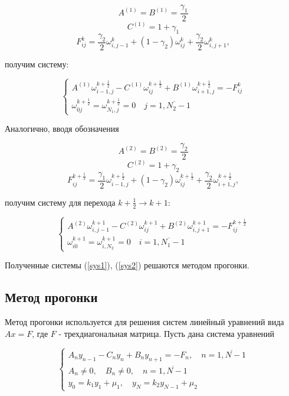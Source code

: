 \documentclass[12pt]{article}
\begin{document}
			$$A^{(1)} = B^{(1)} = \frac{\gamma_1}{2}$$
			$$C^{(1)} = 1 + \gamma_1$$
			$$F^k_{ij} = \frac{\gamma_2}{2} \omega^k_{i,j-1} + (1 - \gamma_2) \omega^k_{ij} + \frac{\gamma_2}{2} \omega^k_{i,j+1},$$
		
			получим систему:
				
				\begin{equation}
					\begin{cases}
						A^{(1)} \omega^{k + \frac{1}{2}}_{i-1,j} - C^{(1)} \omega^{k+\frac{1}{2}}_{ij} + B^{(1)} \omega^{k+\frac{1}{2}}_{i+1,j} = -F^k_{ij} \\
						\omega^{k+\frac{1}{2}}_{0j} = \omega^{k+\frac{1}{2}}_{N_1,j} = 0 \quad j = \overline{1, N_2-1}
					\end{cases}
					\label{sys1}
				\end{equation}
				
			Аналогично, вводя обозначения
			
			$$A^{(2)} = B^{(2)} = \frac{\gamma_2}{2}$$
			$$C^{(2)} = 1 + \gamma_2$$
			$$F^{k+\frac{1}{2}}_{ij} = \frac{\gamma_1}{2} \omega^{k+\frac{1}{2}}_{i-1,j} + (1 - \gamma_2) \omega^{k+\frac{1}{2}}_{ij} + \frac{\gamma_2}{2} \omega^{k+\frac{1}{2}}_{i+1,j},$$
			
			получим систему для перехода $k + \frac{1}{2} \rightarrow k + 1:$
			
				\begin{equation}
					\begin{cases}
						A^{(2)} \omega^{k+1}_{i,j-1} - C^{(2)} \omega^{k+1}_{ij} + B^{(2)} \omega^{k+1}_{i,j+1} = -F^{k + \frac{1}{2}}_{ij} \\
						\omega^{k+1}_{i0} = \omega^{k+1}_{i,N_2} = 0 \quad i = \overline{1, N_1-1}
					\end{cases}
					\label{sys2}
				\end{equation}
			
			Полученные системы (\ref{sys1}), (\ref{sys2}) решаются методом прогонки.
			
		\subsection{Метод прогонки}
			Метод прогонки используется для решения систем линейный уравнений вида $Ax = F$, где $F$ - трехдиагональная матрица.
			Пусть дана система уравнений
			
			\begin{equation}
				\begin{cases}
					A_n y_{n-1} - C_n y_n + B_n y_{n+1} = -F_n, \quad n = \overline{1, N-1} \\
					A_n \neq 0, \quad B_n \neq 0, \quad n = \overline{1, N-1} \\
					y_0 = k_1 y_1 + \mu_1, \quad y_N = k_2 y_{N-1} + \mu_2
				\end{cases}
			\end{equation}
			
\end{document}
